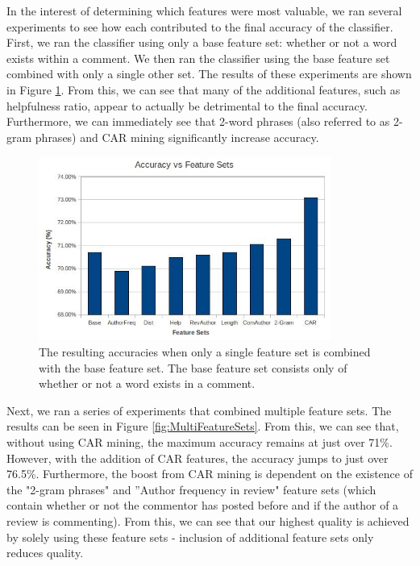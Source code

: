 \documentclass[]{report}
\begin{document}
In the interest of determining which features were most valuable, we ran several experiments to see how each contributed to the final accuracy of the classifier.  First, we ran the classifier using only a base feature set: whether or not a word exists within a comment.  We then ran the classifier using the base feature set combined with only a single other set.  The results of these experiments are shown in Figure \ref{fig:MinimalFeatureSets}.  From this, we can see that many of the additional features, such as helpfulness ratio, appear to actually be detrimental to the final accuracy.  Furthermore, we can immediately see that 2-word phrases (also referred to as 2-gram phrases) and CAR mining significantly increase accuracy.
\begin{figure}[H]
\centering
\includegraphics[width=3.77in]{AccuracyVsFeatureSets.jpg}
\caption{The resulting accuracies when only a single feature set is combined with the base feature set.  The base feature set consists only of whether or not a word exists in a comment.}
\label{fig:MinimalFeatureSets}
\end{figure}

Next, we ran a series of experiments that combined multiple feature sets.  The results can be seen in Figure \ref{fig:MultiFeatureSets}.  From this, we can see that, without using CAR mining, the maximum  accuracy remains at just over 71\%.  However, with the addition of CAR features, the accuracy jumps to just over 76.5\%.  Furthermore, the boost from CAR mining is dependent on the existence of the "2-gram phrases" and ''Author frequency in review" feature sets (which contain whether or not the commentor has posted before and if the author of a review is commenting).  From this, we can see that our highest quality is achieved by solely using these feature sets - inclusion of additional feature sets only reduces quality.
\end{document}
